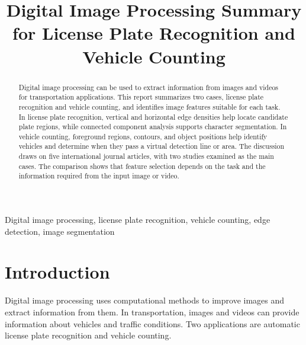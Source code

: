 \documentclass[conference]{IEEEtran}
\begin{document}
	
	\title{Digital Image Processing Summary for License Plate Recognition and Vehicle Counting}
	
	\author{
	}
	
	\maketitle
	
	\begin{abstract}
		Digital image processing can be used to extract information from
		images and videos for transportation applications. This report
		summarizes two cases, license plate recognition and vehicle counting,
		and identifies image features suitable for each task. In license plate
		recognition, vertical and horizontal edge densities help locate
		candidate plate regions, while connected component analysis supports
		character segmentation. In vehicle counting, foreground regions,
		contours, and object positions help identify vehicles and determine
		when they pass a virtual detection line or area. The discussion draws
		on five international journal articles, with two studies examined as
		the main cases. The comparison shows that feature selection depends on
		the task and the information required from the input image or video.
	\end{abstract}
	
	\begin{IEEEkeywords}
		Digital image processing, license plate recognition, vehicle counting,
		edge detection, image segmentation
	\end{IEEEkeywords}
	
	
	
	\section{Introduction}
	
	Digital image processing uses computational methods to improve images
	and extract information from them. In transportation, images and
	videos can provide information about vehicles and traffic conditions.
	Two applications are automatic license plate recognition and vehicle
	counting.
	
\end{document}
